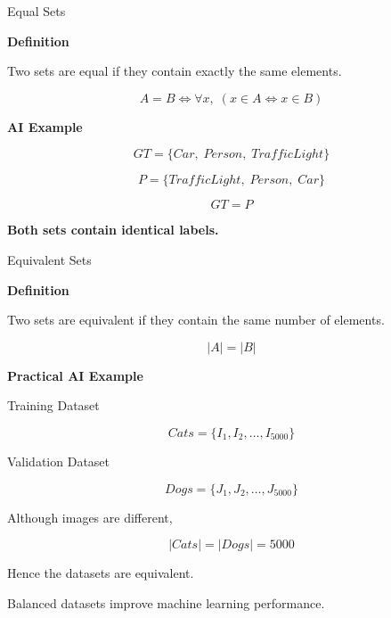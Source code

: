 \documentclass[aspectratio=169]{beamer}
\begin{document}
\begin{frame}{Equal Sets}

\textbf{Definition}

Two sets are equal if they contain exactly the same elements.

\[
A=B
\iff
\forall x,\; (x\in A \Leftrightarrow x\in B)
\]

\vspace{0.3cm}

\textbf{AI Example}

\[
GT=\{Car,\;Person,\;TrafficLight\}
\]

\[
P=\{TrafficLight,\;Person,\;Car\}
\]

\[
GT=P
\]

\centering
\textbf{Both sets contain identical labels.}

\end{frame}
\begin{frame}{Equivalent Sets}

\textbf{Definition}

Two sets are equivalent if they contain the same number of elements.

\[
|A|=|B|
\]

\vspace{0.4cm}

\textbf{Practical AI Example}

Training Dataset

\[
Cats=
\{
I_1,I_2,\ldots,I_{5000}
\}
\]

Validation Dataset

\[
Dogs=
\{
J_1,J_2,\ldots,J_{5000}
\}
\]

Although images are different,

\[
|Cats|=|Dogs|=5000
\]

Hence the datasets are equivalent.

\vspace{0.3cm}

Balanced datasets improve machine learning performance.

\end{frame}
\end{document}
